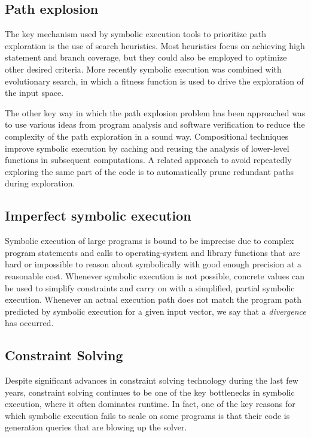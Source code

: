 \subsection{Path explosion}

The key mechanism used by symbolic execution tools to prioritize path exploration is the use of search heuristics. Most heuristics focus on achieving high statement and branch coverage, but they could also be employed to optimize other desired criteria.
More recently symbolic execution was combined with evolutionary search, in which a fitness function is used to drive the exploration of the input space.

The other key way in which the path explosion problem has been approached was to use various ideas from program analysis and software verification to reduce the complexity of the path exploration in a sound way.
Compositional techniques improve symbolic execution by caching and reusing the analysis of lower-level functions in subsequent computations.
A related approach to avoid repeatedly exploring the same part of the code is to automatically prune redundant paths during exploration.

\subsection{Imperfect symbolic execution}
Symbolic execution of large programs is bound to be imprecise due to complex program statements and calls to operating-system and library functions that are hard or impossible to reason about symbolically with good enough precision at a reasonable cost. Whenever symbolic execution is not possible, concrete values can be used to simplify constraints and carry on with a simplified, partial symbolic execution.
Whenever an actual execution path does not match the program path predicted by symbolic execution for a given input vector, we say that a \textit{divergence} has occurred.

\subsection{Constraint Solving}

Despite significant advances in constraint solving technology during the last few years, constraint solving continues to be one of the key bottlenecks in symbolic execution, where it often dominates runtime. In fact, one of the key reasons for which symbolic execution fails to scale on some programs is that their code is generation queries that are blowing up the solver.

